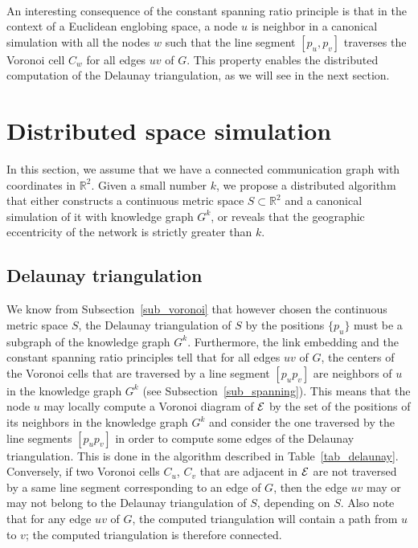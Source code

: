 \documentclass{article}
\newcommand{\englobing}{{\cal E}}
\begin{document}
\paragraph{}

An interesting consequence of the constant spanning ratio principle is that in the context of a Euclidean englobing space, a node $u$ is neighbor in a canonical simulation with all the nodes $w$ such that the line segment $[p_u,p_v]$ traverses the Voronoi cell $C_w$ for all edges $uv$ of $G$. This property enables the distributed computation of the Delaunay triangulation, as we will see in the next section.

\section{Distributed space simulation}
\label{sec_distributed}

In this section, we assume that we have a connected communication graph with coordinates in $\mathbb{R}^2$. Given a small number $k$, we propose a distributed algorithm that either constructs a continuous metric space $S\subset\mathbb{R}^2$ and a canonical simulation of it with knowledge graph $G^k$, or reveals that the geographic eccentricity of the network is strictly greater than $k$.

\subsection{Delaunay triangulation}
\label{sub_dist_delaunay}

We know from Subsection~\ref{sub_voronoi} that however chosen the continuous metric space $S$, the Delaunay triangulation of $S$ by the positions $\{p_u\}$ must be a subgraph of the knowledge graph $G^k$. Furthermore, the link embedding and the constant spanning ratio principles tell that for all edges $uv$ of $G$, the centers of the Voronoi cells that are traversed by a line segment $[p_up_v]$ are neighbors of $u$ in the knowledge graph $G^k$ (see Subsection~\ref{sub_spanning}). This means that the node $u$ may locally compute a Voronoi diagram of $\englobing$ by the set of the positions of its neighbors in the knowledge graph $G^k$ and consider the one traversed by the line segments $[p_up_v]$ in order to compute some edges of the Delaunay triangulation. This is done in the algorithm described in Table~\ref{tab_delaunay}. Conversely, if two Voronoi cells $C_u$, $C_v$ that are adjacent in $\englobing$ are not traversed by a same line segment corresponding to an edge of $G$, then the edge $uv$ may or may not belong to the Delaunay triangulation of $S$, depending on $S$. Also note that for any edge $uv$ of $G$, the computed triangulation will contain a path from $u$ to $v$; the computed triangulation is therefore connected.
\end{document}
